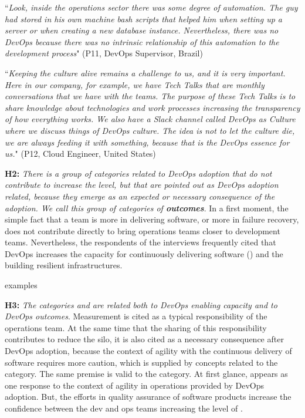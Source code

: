 \begin{mq}
``\emph{Look, inside the operations sector there was some degree of automation. The guy
had stored in his own machine bash scripts that helped him when setting up a
server or when creating a new database instance. Nevertheless, there was no DevOps
because there was no intrinsic relationship of this automation to the
development process}" (P11, DevOps Supervisor, Brazil)
\end{mq} 


\begin{mq}
``\emph{Keeping the culture alive remains a challenge to us, and it is very
important. Here in our company, for example, we have Tech Talks that are
monthly conversations that we have with the teams. The purpose of these Tech
Talks is to share knowledge about technologies and work processes increasing the
transparency of how everything works. We also have a Slack channel called
DevOps as Culture where we discuss things of DevOps culture. The idea is not to
let the culture die, we are always feeding it with something, because that is
the DevOps essence for us.}" (P12, Cloud Engineer, United States)
\end{mq}

\textbf{H2:} \textit{There is a group of categories related to DevOps adoption
that do not contribute to increase the  level, but that are
pointed out as DevOps adoption related, because they emerge as an expected or
necessary consequence of the adoption. We call this group of categories of
\textbf{outcomes}}. In a first moment, the simple fact that a team is more
 in delivering software, or more  in failure recovery, does not
contribute directly to bring operations teams closer to development teams.
Nevertheless, the respondents of the interviews frequently cited that DevOps  
increases the capacity for continuously delivering software () 
and the building resilient infrastructures.

{\color{red}examples} 

\textbf{H3:} \textit{The categories  and  
are related both to DevOps enabling capacity and to DevOps outcomes}. 
Measurement is cited as a typical responsibility of the operations team. 
At the same time that the sharing of this responsibility contributes to reduce the silo, 
it is also cited as a necessary consequence after DevOps adoption, because 
the context of agility with the continuous delivery of software requires more caution, 
which is supplied by concepts related to the  category. 
The same premise is valid to the  category. At first glance, 
 appears as one response to the context of agility in operations 
provided by DevOps adoption. But, the efforts in quality assurance of software products 
increase the confidence between the dev and ops teams increasing the level 
of .

